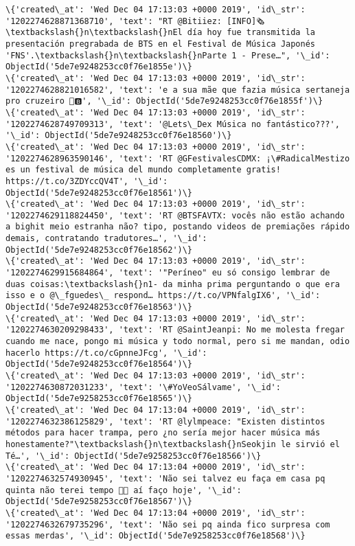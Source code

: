 \documentclass[11pt]{article}
\begin{document}
\begin{Verbatim}[commandchars=\\\{\}]
\{'created\_at': 'Wed Dec 04 17:13:03 +0000 2019', 'id\_str': '1202274628871368710', 'text': "RT @Bitiiez: [INFO]🗞\textbackslash{}n\textbackslash{}nEl día hoy fue transmitida la presentación pregrabada de BTS en el Festival de Música Japonés 'FNS'.\textbackslash{}n\textbackslash{}nParte 1 - Prese…", '\_id': ObjectId('5de7e9248253cc0f76e1855e')\}
\{'created\_at': 'Wed Dec 04 17:13:03 +0000 2019', 'id\_str': '1202274628821016582', 'text': 'e a sua mãe que fazia música sertaneja pro cruzeiro 👻🅱️', '\_id': ObjectId('5de7e9248253cc0f76e1855f')\}
\{'created\_at': 'Wed Dec 04 17:13:03 +0000 2019', 'id\_str': '1202274628749709313', 'text': '@Lets\_Dex Música no fantástico???', '\_id': ObjectId('5de7e9248253cc0f76e18560')\}
\{'created\_at': 'Wed Dec 04 17:13:03 +0000 2019', 'id\_str': '1202274628963590146', 'text': 'RT @GFestivalesCDMX: ¡\#RadicalMestizo es un festival de música del mundo completamente gratis! https://t.co/3ZDYccQV4T', '\_id': ObjectId('5de7e9248253cc0f76e18561')\}
\{'created\_at': 'Wed Dec 04 17:13:03 +0000 2019', 'id\_str': '1202274629118824450', 'text': 'RT @BTSFAVTX: vocês não estão achando a bighit meio estranha não? tipo, postando videos de premiações rápido demais, contratando tradutores…', '\_id': ObjectId('5de7e9248253cc0f76e18562')\}
\{'created\_at': 'Wed Dec 04 17:13:03 +0000 2019', 'id\_str': '1202274629915684864', 'text': '"Períneo" eu só consigo lembrar de duas coisas:\textbackslash{}n1- da minha prima perguntando o que era isso e o @\_fguedes\_ respond… https://t.co/VPNfalgIX6', '\_id': ObjectId('5de7e9248253cc0f76e18563')\}
\{'created\_at': 'Wed Dec 04 17:13:03 +0000 2019', 'id\_str': '1202274630209298433', 'text': 'RT @SaintJeanpi: No me molesta fregar cuando me nace, pongo mi música y todo normal, pero si me mandan, odio hacerlo https://t.co/cGpnneJFcg', '\_id': ObjectId('5de7e9248253cc0f76e18564')\}
\{'created\_at': 'Wed Dec 04 17:13:03 +0000 2019', 'id\_str': '1202274630872031233', 'text': '\#YoVeoSálvame', '\_id': ObjectId('5de7e9258253cc0f76e18565')\}
\{'created\_at': 'Wed Dec 04 17:13:04 +0000 2019', 'id\_str': '1202274632386125829', 'text': 'RT @lylmpeace: "Existen distintos métodos para hacer trampa, pero ¿no sería mejor hacer música más honestamente?"\textbackslash{}n\textbackslash{}nSeokjin le sirvió el Té…', '\_id': ObjectId('5de7e9258253cc0f76e18566')\}
\{'created\_at': 'Wed Dec 04 17:13:04 +0000 2019', 'id\_str': '1202274632574930945', 'text': 'Não sei talvez eu faça em casa pq quinta não terei tempo 🤔🤔 aí faço hoje', '\_id': ObjectId('5de7e9258253cc0f76e18567')\}
\{'created\_at': 'Wed Dec 04 17:13:04 +0000 2019', 'id\_str': '1202274632679735296', 'text': 'Não sei pq ainda fico surpresa com essas merdas', '\_id': ObjectId('5de7e9258253cc0f76e18568')\}

\end{Verbatim}
\end{document}
